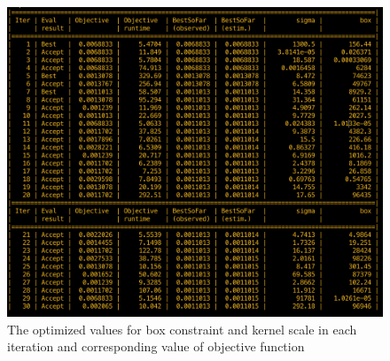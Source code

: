\begin{figure}
\begin{center}
\includegraphics[width=1.13\textwidth]{figures/optimizationSummaryStuckFault}    %
\caption{The optimized values for box constraint and kernel scale in each iteration and corresponding value of objective function} 
\label{fig:optBayesianSteps}
\end{center}
\end{figure}

